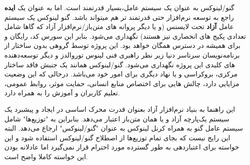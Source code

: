 گنو/لینوکس به عنوان یک سیستم عامل،بسیار قدرتمند است. اما به عنوان یک
{\bfseries ایده}
راجع به توسعه نرم‌افزار حتی قدرتمند تر هم میتواند باشد. گنو لینوکس یک سیستم عامل
{\bfseries آزاد}
تحت لایسنس
(و یا دیگر پروانه های متن‌باز/نرم‌افزار آزاد که گاها شامل تعدادی پکیج های انحصاری نیز هستند) 
نگهداری می‌شود. بنابر این سورس کد، رایگان و برای همیشه در دسترس همگان خواهد بود.
این پروژه توسط گروهی بدون ساختار از برنامه‌نویسان سرتاسر دنیا زیر نظر راهبری فنی
لینوس توروالدز و دیگر توسعه‌دهنده های کلیدی این پروژه نگهداری می‌شود.
گنو/لینوکس همانند یک جنبش فاقد ساختار مرکزی، بروکراسی و یا نهاد دیگری برای امور خود می‌باشد.
درحالی که این وضعیت مزایایی دارد، چالش هایی برای اختصاص منابع انسانی، حمایت موثر، روابط عمومی،
تعلیم کاربران و آموزش را به همراه دارد.

\begin{note}
این راهنما به بنیاد نرم‌افزار آزاد
بعنوان قدرت محرک اساسی در ایجاد و پیشبرد یک سیستم یک‌پارچه آزاد و یا همان متن‌باز اعتبار می‌دهد.
بنابراین به "توزیع‌ها" شامل سیستم عامل گنو به همراه کرنل لینوکس به عنوان "گنو/لینوکس" ارجاع می‌دهد.
البته این رایج نیست که بجای تمام توزیع‌ها از اصطلاح گنو/لینوکس استفاده شود و این خواسته
برای اعتباردهی به طور گسترده مورد احترام قرار نمی‌گیرد اما عادلانه بودن این خواسته کاملا واضح است.
\end{note}



